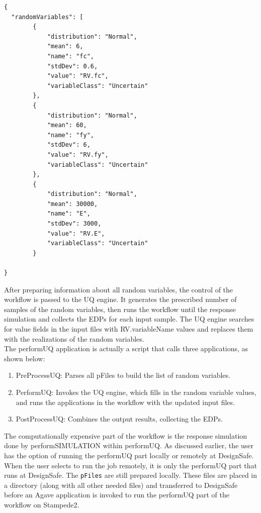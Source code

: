 \begin{lstlisting}
{
  "randomVariables": [
        {
            "distribution": "Normal",
            "mean": 6,
            "name": "fc",
            "stdDev": 0.6,
            "value": "RV.fc",
            "variableClass": "Uncertain"
        },
        {
            "distribution": "Normal",
            "mean": 60,
            "name": "fy",
            "stdDev": 6,
            "value": "RV.fy",
            "variableClass": "Uncertain"
        },
        {
            "distribution": "Normal",
            "mean": 30000,
            "name": "E",
            "stdDev": 3000,
            "value": "RV.E",
            "variableClass": "Uncertain"
        }

}
\end{lstlisting}

After preparing information about all random variables, the control of the workflow is passed to the UQ engine. It generates the prescribed number of samples of the random variables, then runs the workflow until the response simulation and collects the EDPs for each input sample. The UQ engine searches for value fields in the input files with RV.variableName values and replaces them with the realizations of the random variables.\\

The performUQ application is actually a script that calls three applications, as shown below:

\begin{enumerate}
    \item PreProcessUQ: Parses all pFiles to build the list of random variables.
    \item PerformUQ: Invokes the UQ engine, which fills in the random variable values, and runs the applications in the workflow with the updated input files.
    \item PostProcessUQ: Combines the output results, collecting the EDPs.
\end{enumerate}

The computationally expensive part of the workflow is the response simulation done by performSIMULATION within performUQ. As discussed earlier, the user has the option of running the performUQ part locally or remotely at DesignSafe. When the user selects to run the job remotely, it is only the performUQ part that runs at DesignSafe. The \texttt{pFiles} are still prepared locally. These files are placed in a directory (along with all other needed files) and transferred to DesignSafe before an Agave application is invoked to run the performUQ part of the workflow on Stampede2.

